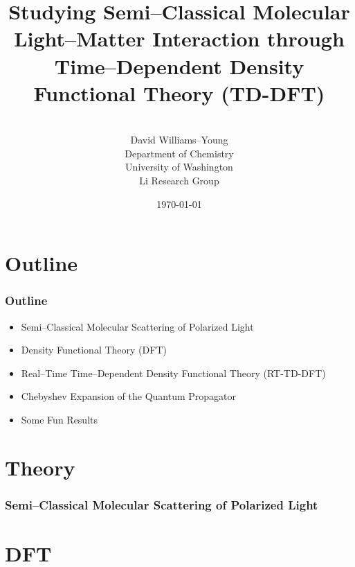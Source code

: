 \documentclass{beamer}
\title[]{Studying Semi--Classical Molecular Light--Matter Interaction through
Time--Dependent Density Functional Theory (TD-DFT)}
\author[Li Research Group, University of Washington]{
\\[1\baselineskip]
David Williams--Young \\
Department of Chemistry \\
University of Washington \\
Li Research Group
}
\date{\today}
\begin{document}
\begin{frame}
\titlepage
\end{frame}


\section{Outline}


\begin{frame}
\frametitle{Outline}

\begin{itemize}
  \item Semi--Classical Molecular Scattering of Polarized Light
  \item Density Functional Theory (DFT)
  \item Real--Time Time--Dependent Density Functional Theory (RT-TD-DFT)
  \item Chebyshev Expansion of the Quantum Propagator
  \item Some Fun Results
\end{itemize}
\end{frame}

\section{Theory}

\begin{frame}
\frametitle{Semi--Classical Molecular Scattering of Polarized Light}
\end{frame}


\section{DFT}
\end{document}
